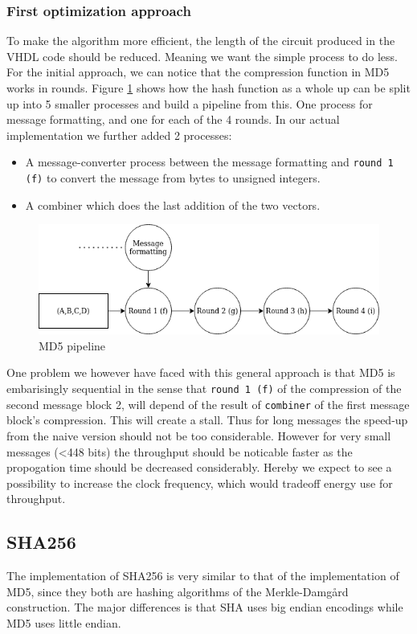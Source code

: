 \documentclass[a4paper]{article}
\begin{document}
\subsubsection{First optimization approach}
\label{sec:orgc708985}
To make the algorithm more efficient, the length of the circuit produced in the VHDL code should be reduced. Meaning we want the simple process to do less. For the initial approach, we can notice that the compression function in MD5 works in rounds. Figure \ref{fig:MD5opt1} shows how the hash function as a whole up can be split up into 5 smaller processes and build a pipeline from this. One process for message formatting, and one for each of the 4 rounds. In our actual implementation we further added 2 processes:
\begin{itemize}
\item A message-converter process between the message formatting and \texttt{round 1 (f)} to convert the message from bytes to unsigned integers.
\item A combiner which does the last addition of the two vectors.
\end{itemize}

\begin{figure}[H]
\centering
\includegraphics[width=.9\linewidth]{./Implementation/md5.png}
\caption{\label{fig:MD5opt1}MD5 pipeline}
\end{figure}
One problem we however have faced with this general approach is that MD5 is embarisingly sequential in the sense that \texttt{round 1 (f)} of the compression of the second message block 2, will depend of the result of \texttt{combiner} of the first message block's compression. This will create a stall. Thus for long messages the speed-up from the naive version should not be too considerable. However for very small messages (<448 bits) the throughput should be noticable faster as the propogation time should be decreased considerably. Hereby we expect to see a possibility to increase the clock frequency, which would tradeoff energy use for throughput.
\subsection{SHA256}
\label{sec:orgf1ce90f}
The implementation of SHA256 is very similar to that of the implementation of MD5,
since they both are hashing algorithms of the Merkle-Damgård construction.
The major differences is that SHA uses big endian encodings while MD5 uses little endian.
\end{document}
